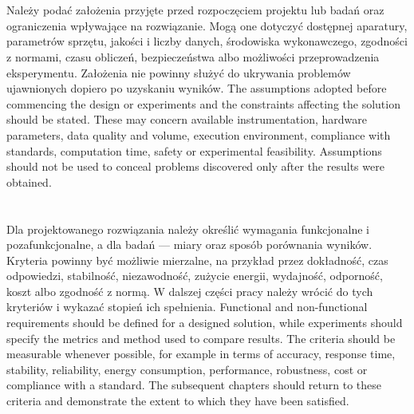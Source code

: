 \section{}

\ploren
  {Należy podać założenia przyjęte przed rozpoczęciem projektu lub badań oraz ograniczenia wpływające na rozwiązanie. Mogą one dotyczyć dostępnej aparatury, parametrów sprzętu, jakości i liczby danych, środowiska wykonawczego, zgodności z normami, czasu obliczeń, bezpieczeństwa albo możliwości przeprowadzenia eksperymentu. Założenia nie powinny służyć do ukrywania problemów ujawnionych dopiero po uzyskaniu wyników.}
  {The assumptions adopted before commencing the design or experiments and the constraints affecting the solution should be stated. These may concern available instrumentation, hardware parameters, data quality and volume, execution environment, compliance with standards, computation time, safety or experimental feasibility. Assumptions should not be used to conceal problems discovered only after the results were obtained.}

\section{}

\ploren
  {Dla projektowanego rozwiązania należy określić wymagania funkcjonalne i pozafunkcjonalne, a dla badań — miary oraz sposób porównania wyników. Kryteria powinny być możliwie mierzalne, na przykład przez dokładność, czas odpowiedzi, stabilność, niezawodność, zużycie energii, wydajność, odporność, koszt albo zgodność z normą. W dalszej części pracy należy wrócić do tych kryteriów i wykazać stopień ich spełnienia.}
  {Functional and non-functional requirements should be defined for a designed solution, while experiments should specify the metrics and method used to compare results. The criteria should be measurable whenever possible, for example in terms of accuracy, response time, stability, reliability, energy consumption, performance, robustness, cost or compliance with a standard. The subsequent chapters should return to these criteria and demonstrate the extent to which they have been satisfied.}

\section{}

